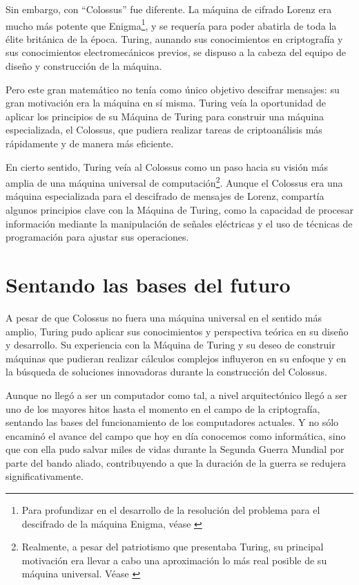 Sin embargo, con ``Colossus'' fue diferente. La máquina de cifrado Lorenz era mucho más potente que Enigma\footnote{Para profundizar en el desarrollo de la resolución del problema para el descifrado de la máquina Enigma, véase \cite{hodges1983alan}}, y se requería para poder abatirla de toda la élite británica de la época. Turing, aunando sus conocimientos
en criptografía y sus conocimientos electromecánicos previos, se dispuso a la cabeza del equipo de diseño y construcción de la máquina. 

Pero este gran matemático no tenía como único objetivo descifrar mensajes: 
su gran motivación era la máquina en sí misma. Turing veía la oportunidad de aplicar los principios de su Máquina de Turing para construir una máquina especializada, el Colossus, que pudiera realizar tareas de 
criptoanálisis más rápidamente y de manera más eficiente.

En cierto sentido, Turing veía al Colossus como un paso hacia su visión más amplia de una máquina universal de computación\footnote{Realmente, a pesar del patriotismo que presentaba Turing, su principal motivación era llevar a
cabo una aproximación lo más real posible de su máquina universal. Véase \cite{hodges1983alan}}. Aunque el Colossus era una máquina especializada para el descifrado de mensajes de Lorenz, 
compartía algunos principios clave con la Máquina de Turing, como la capacidad de procesar información mediante la manipulación de señales eléctricas y el uso de técnicas de programación para ajustar sus operaciones.

\section{Sentando las bases del futuro}

A pesar de que Colossus no fuera una máquina universal en el sentido más amplio, Turing pudo aplicar sus conocimientos y perspectiva teórica en su diseño y desarrollo. Su experiencia con la Máquina de Turing y su 
deseo de construir máquinas que pudieran realizar cálculos complejos influyeron en su enfoque y en la búsqueda de soluciones innovadoras durante la construcción del Colossus.

Aunque no llegó a ser un computador como tal, a nivel arquitectónico llegó a ser uno de los mayores hitos hasta el momento en el campo de la criptografía, sentando las bases del funcionamiento de los computadores actuales. Y no sólo
encaminó el avance del campo que hoy en día conocemos como informática, sino que con ella pudo salvar miles de vidas durante la Segunda Guerra Mundial por parte del bando aliado, contribuyendo a que la duración de
la guerra se redujera significativamente.


